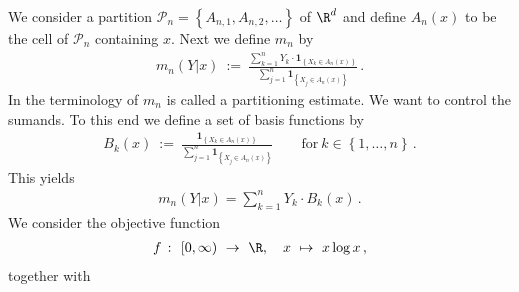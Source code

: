 We consider a partition
$
  \mathcal{P}_n
  =
  \left\{ 
    A_{n,1}
    ,
    A_{n,2}
    ,
    \ldots
  \right\}
$
of $ \R^d $
and define
$ A_n(x) $ to be the cell of $ \mathcal{P}_n $ containing $x$.
Next we define $ m_n $ by
\begin{gather}
  m_n(Y|x)
  \ 
  :=
  \ 
  \frac
  {
    \sum_{k=1}^{n} 
    Y_k
    \cdot
    \mathbf{1}
    _
    {
      \left\{ 
      X_k \in A_n(x)
      \right\}
    }
  }
  {
    \sum_{j=1}^{n} 
    \mathbf{1}
    _
    {
      \left\{ 
      X_j \in A_n(x)
      \right\}
    }
  }
  \,.
\end{gather}
In the terminology of \cite[§4]{Gyorfi2002}
$m_n$ is called a partitioning estimate.
We want to control the sumands.
To this end we define a set of basis functions by
\begin{gather}
  B_k(x)
  \ 
  :=
  \ 
  \frac
  {
    \mathbf{1}
    _
    {
      \left\{ 
      X_k \in A_n(x)
      \right\}
    }
  }
  {
    \sum_{j=1}^{n} 
    \mathbf{1}
    _
    {
      \left\{ 
      X_j \in A_n(x)
      \right\}
    }
  }
  \qquad
  \text{for}\ 
  k \in \left\{ 1,\ldots,n \right\}
  \,.
\end{gather}
This yields
\begin{gather}
  m_n(Y|x)
  =
  \sum_{k=1}^{n} 
  Y_k
  \cdot
  B_k(x)
  \,.
\end{gather}
We consider the objective function
\begin{gather}
  f
  \ 
  \colon
  \ 
  [0,\infty)
  \ 
  \to 
  \ 
  \R
  ,
  \quad
  x
  \ 
  \mapsto
  \ 
  x \log x\,,
\end{gather}
together with 

